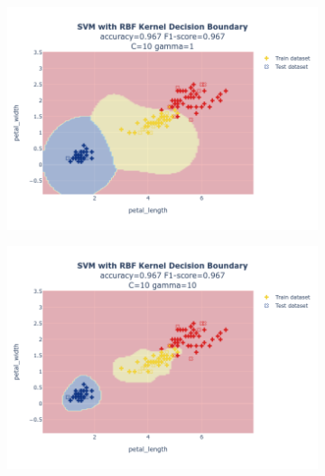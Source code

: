 \documentclass{article}
\begin{document}
\begin{figure}
\begin{subfigure}{0.3\textwidth}
        \includegraphics[scale=.13]{images/implementation/q1/rbf_kernel/petal_length_petal_width_10_1.png}
    \end{subfigure}
    \hfill
    \begin{subfigure}{0.3\textwidth}
        \centering
        \includegraphics[scale=.13]{images/implementation/q1/rbf_kernel/petal_length_petal_width_10_10.png}
    \end{subfigure}
    \newline
    \begin{subfigure}{0.3\textwidth}
        \centering

\end{subfigure}
\end{figure}
\end{document}
